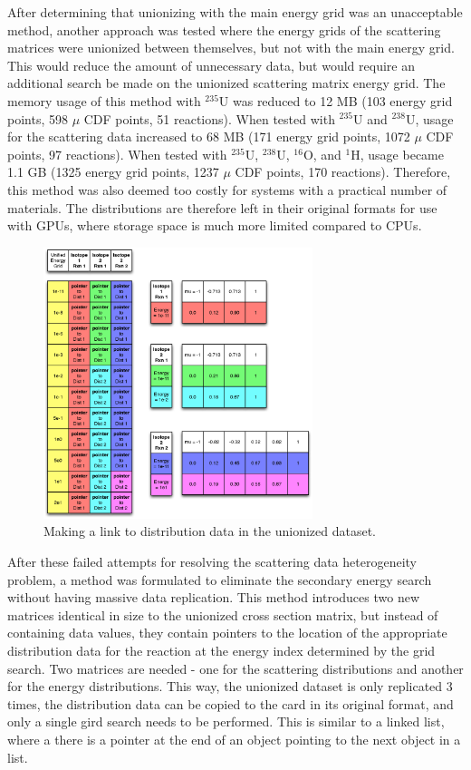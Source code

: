After determining that unionizing with the main energy grid was an unacceptable method, another approach was tested where the energy grids of the scattering matrices were unionized between themselves, but not with the main energy grid.  This would reduce the amount of unnecessary data, but would require an additional search be made on the unionized scattering matrix energy grid.  The memory usage of this method with $^{235}$U was reduced to 12 MB (103 energy grid points, 598 $\mu$ CDF points, 51 reactions).  When tested with $^{235}$U and $^{238}$U, usage for the scattering data increased to 68 MB (171 energy grid points, 1072 $\mu$ CDF points, 97 reactions).  When tested with $^{235}$U, $^{238}$U, $^{16}$O, and $^{1}$H, usage became 1.1 GB (1325 energy grid points, 1237 $\mu$ CDF points, 170 reactions).  Therefore, this method was also deemed too costly for systems with a practical number of materials.  The distributions are therefore left in their original formats for use with GPUs, where storage space is much more limited compared to CPUs.


\begin{figure}[h!] 
\centering
\includegraphics[width=0.7\textwidth]{graphics/unionized_pointers.eps}
\caption{Making a link to distribution data in the unionized dataset. \label{unionized_pointers} }
\end{figure}

After these failed attempts for resolving the scattering data heterogeneity problem, a method was formulated to eliminate the secondary energy search without having massive data replication.  This method introduces two new matrices identical in size to the unionized cross section matrix, but instead of containing data values, they contain pointers to the location of the appropriate distribution data for the reaction at the energy index determined by the grid search.  Two matrices are needed - one for the scattering distributions and another for the energy distributions.  This way, the unionized dataset is only replicated 3 times, the distribution data can be copied to the card in its original format, and only a single gird search needs to be performed.  This is similar to a linked list, where a there is a pointer at the end of an object pointing to the next object in a list.  


